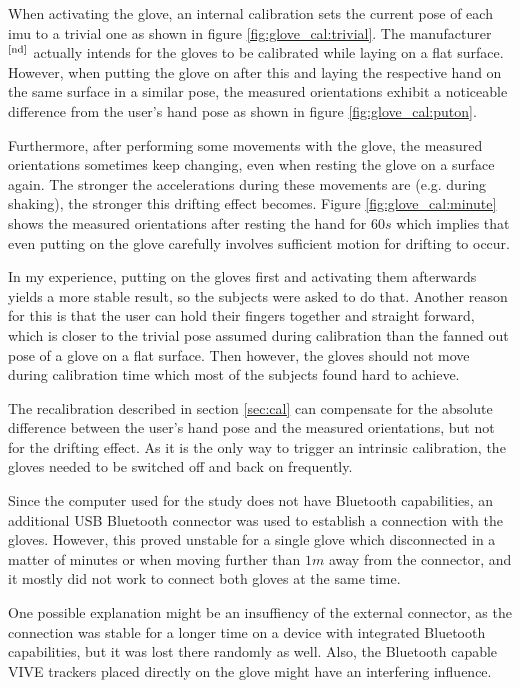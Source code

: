 \documentclass[hyperref, bachelorofscience]{cgvpub}
\newcommand{\newcite}[1]{$ ^{\text{\cite{#1}}} $}
\begin{document}
When activating the glove, an internal calibration sets the current pose of each \acrshort{imu} to a trivial one as shown in figure \ref{fig:glove_cal:trivial}. The manufacturer\newcite{nd} actually intends for the gloves to be calibrated while laying on a flat surface. However, when putting the glove on after this and laying the respective hand on the same surface in a similar pose, the measured orientations exhibit a noticeable difference from the user's hand pose as shown in figure \ref{fig:glove_cal:puton}. 

Furthermore, after performing some movements with the glove, the measured orientations sometimes keep changing, even when resting the glove on a surface again. The stronger the accelerations during these movements are (e.g. during shaking), the stronger this drifting effect becomes. Figure \ref{fig:glove_cal:minute} shows the measured orientations after resting the hand for $ 60s $ which implies that even putting on the glove carefully involves sufficient motion for drifting to occur.

In my experience, putting on the gloves first and activating them afterwards yields a more stable result, so the subjects were asked to do that. Another reason for this is that the user can hold their fingers together and straight forward, which is closer to the trivial pose assumed during calibration than the fanned out pose of a glove on a flat surface. Then however, the gloves should not move during calibration time which most of the subjects found hard to achieve.

The recalibration described in section \ref{sec:cal} can compensate for the absolute difference between the user's hand pose and the measured orientations, but not for the drifting effect. As it is the only way to trigger an intrinsic calibration, the gloves needed to be switched off and back on frequently. 

Since the computer used for the study does not have Bluetooth capabilities, an additional USB Bluetooth connector was used to establish a connection with the gloves. However, this proved unstable for a single glove which disconnected in a matter of minutes or when moving further than $ 1m $ away from the connector, and it mostly did not work to connect both gloves at the same time. 

One possible explanation might be an insuffiency of the external connector, as the connection was stable for a longer time on a device with integrated Bluetooth capabilities, but it was lost there randomly as well. Also, the Bluetooth capable \Gls{VIVE} trackers placed directly on the glove might have an interfering influence.
\end{document}
